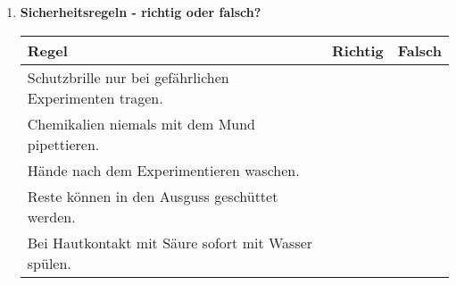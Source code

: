 \begin{enumerate}[label=\arabic*.]
    \vspace{1cm}

    \item \textbf{Sicherheitsregeln - richtig oder falsch?}
    \vspace{0.5cm}

    \begin{tabularx}{\textwidth}{|X|c|c|}
        \hline
        \textbf{Regel} & \textbf{Richtig} & \textbf{Falsch} \\
        \hline
        Schutzbrille nur bei gefährlichen Experimenten tragen. & & \\
        \hline
        Chemikalien niemals mit dem Mund pipettieren. & & \\
        \hline
        Hände nach dem Experimentieren waschen. & & \\
        \hline
        Reste können in den Ausguss geschüttet werden. & & \\
        \hline
        Bei Hautkontakt mit Säure sofort mit Wasser spülen. & & \\
        \hline
    \end{tabularx}

\end{enumerate}